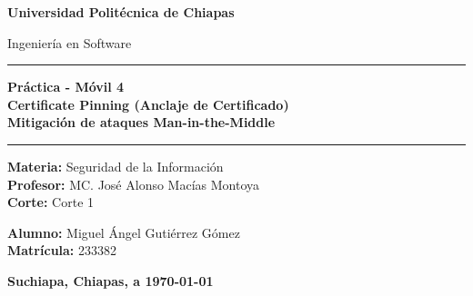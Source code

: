 \documentclass[12pt, a4paper]{article} %
\newcommand{\nombreuniversidad}{Universidad Politécnica de Chiapas}
\newcommand{\nombrecarrera}{Ingeniería en Software}
\newcommand{\nombremateria}{Seguridad de la Información}
\newcommand{\nombreprofesor}{MC. José Alonso Macías Montoya}
\newcommand{\corte}{Corte 1}
\newcommand{\actividad}{Práctica - Móvil 4 \\ Certificate Pinning (Anclaje de Certificado) \\ Mitigación de ataques Man-in-the-Middle}
\newcommand{\nombres}{Miguel Ángel Gutiérrez Gómez}
\newcommand{\matricula}{233382}
\newcommand{\fechaentrega}{\today} %
\newcommand{\ciudad}{Suchiapa, Chiapas}
\begin{document}
\begin{titlepage}
    \centering
    \vspace*{1cm} %
    {\Huge\bfseries \nombreuniversidad \par} %
    \vspace{0.5cm}
    {\Large \nombrecarrera \par} %

    \vspace{2cm}
    \rule{\textwidth}{1.5pt} %
    \vspace{0.4cm}
    {\Large\bfseries \actividad \par} %
    \vspace{0.4cm}
    \rule{\textwidth}{1.5pt} %

    \vspace{3cm}

    \begin{flushleft}
        \centering %
        \textbf{Materia:} \nombremateria \\
        \textbf{Profesor:} \nombreprofesor \\
        \textbf{Corte:} \corte
    \end{flushleft}

    \vspace{0.5cm} %

    \begin{flushleft}
        \centering %
        \textbf{Alumno:} \nombres \\
        \textbf{Matrícula:} \matricula \\
    \end{flushleft}

    \vfill %

    \vspace{1cm}
    \textbf{\ciudad, a \fechaentrega}

\end{titlepage}

\clearpage %

\tableofcontents
\clearpage
\end{document}
